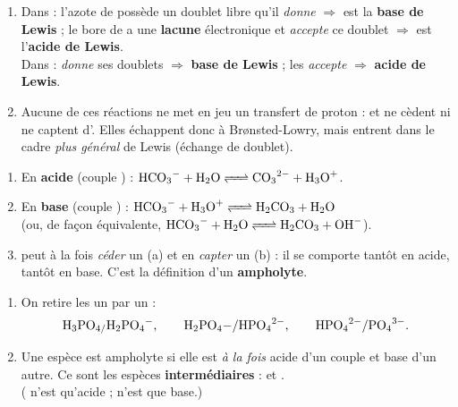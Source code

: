 \documentclass[11pt,a4paper]{article}
\begin{document}

\begin{corrige}
\begin{enumerate}[label=\alph*)]
  \item Dans  : l'azote de  possède un doublet libre qu'il \emph{donne} $\Rightarrow$
         est la \textbf{base de Lewis} ; le bore de  a une \textbf{lacune} électronique et
        \emph{accepte} ce doublet $\Rightarrow$  est l'\textbf{acide de Lewis}. \\
        Dans  :  \emph{donne} ses doublets $\Rightarrow$ \textbf{base de Lewis} ;
         les \emph{accepte} $\Rightarrow$ \textbf{acide de Lewis}.
  \item Aucune de ces réactions ne met en jeu un transfert de proton  :  et  ne cèdent ni
        ne captent d'. Elles échappent donc à Brønsted-Lowry, mais entrent dans le cadre \emph{plus
        général} de Lewis (échange de doublet).
\end{enumerate}
\end{corrige}

\begin{corrige}
\begin{enumerate}[label=\alph*)]
  \item En \textbf{acide} (couple ) : $\ce{HCO3- + H2O <=> CO3^{2-} + H3O+}$.
  \item En \textbf{base} (couple ) : $\ce{HCO3- + H3O+ <=> H2CO3 + H2O}$ \\
        (ou, de façon équivalente, $\ce{HCO3- + H2O <=> H2CO3 + OH-}$).
  \item {} peut à la fois \emph{céder} un  (a) et en \emph{capter} un (b) : il se comporte tantôt
        en acide, tantôt en base. C'est la définition d'un \textbf{ampholyte}.
\end{enumerate}
\end{corrige}

\begin{corrige}
\begin{enumerate}[label=\alph*)]
  \item On retire les  un par un : \[ \ce{H3PO4/H2PO4-},\qquad \ce{H2PO4-/HPO4^{2-}},\qquad \ce{HPO4^{2-}/PO4^{3-}}. \]
  \item Une espèce est ampholyte si elle est \emph{à la fois} acide d'un couple et base d'un autre. Ce sont les
        espèces \textbf{intermédiaires} : \textbf{} et \textbf{}. \\
        ( n'est qu'acide ;  n'est que base.)
\end{enumerate}
\end{corrige}
\end{document}
